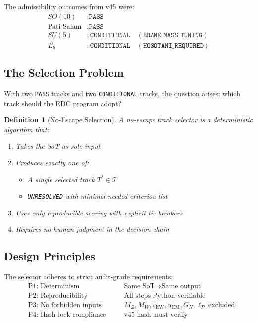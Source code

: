 \documentclass[11pt,a4paper]{article}
\newtheorem{definition}{Definition}[section]
\begin{document}
The admissibility outcomes from v45 were:
\begin{equation}
\label{eq:v45-outcomes}
\begin{aligned}
SO(10) &: \texttt{PASS} \\
\text{Pati-Salam} &: \texttt{PASS} \\
SU(5) &: \texttt{CONDITIONAL} \quad (\texttt{BRANE\_MASS\_TUNING}) \\
E_6 &: \texttt{CONDITIONAL} \quad (\texttt{HOSOTANI\_REQUIRED})
\end{aligned}
\end{equation}

\subsection{The Selection Problem}
\label{subsec:selection-problem}

With two \texttt{PASS} tracks and two \texttt{CONDITIONAL} tracks, the question
arises: which track should the EDC program adopt?

\begin{definition}[No-Escape Selection]
\label{def:no-escape}
A \emph{no-escape track selector} is a deterministic algorithm that:
\begin{enumerate}
\item Takes the SoT as sole input
\item Produces exactly one of:
\begin{itemize}
\item A single selected track $T^* \in \mathcal{T}$
\item \texttt{UNRESOLVED} with minimal-needed-criterion list
\end{itemize}
\item Uses only reproducible scoring with explicit tie-breakers
\item Requires no human judgment in the decision chain
\end{enumerate}
\end{definition}

\subsection{Design Principles}
\label{subsec:design-principles}

The selector adheres to strict audit-grade requirements:
\begin{equation}
\label{eq:design-principles}
\boxed{
\begin{aligned}
&\text{P1: Determinism} \quad && \text{Same SoT} \Rightarrow \text{Same output} \\
&\text{P2: Reproducibility} \quad && \text{All steps Python-verifiable} \\
&\text{P3: No forbidden inputs} \quad && M_Z, M_W, v_{\text{EW}}, \alpha_{\text{EM}}, G_N, \ell_P \text{ excluded} \\
&\text{P4: Hash-lock compliance} \quad && \text{v45 hash must verify}
\end{aligned}
}
\end{equation}
\end{document}
